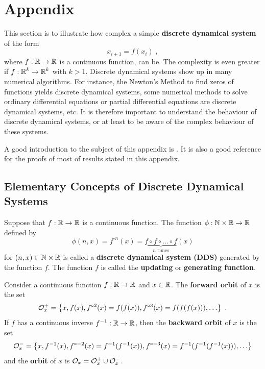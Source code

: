 \section{Appendix}

This section is to illustrate how complex a simple
{\bfseries discrete dynamical system}\label{Discrete Dynamical System}
of the form
\[
x_{i+1} = f(x_i)  \; ,
\]
where $f:\mathbb{R}\rightarrow \mathbb{R}$ is a continuous function, can be.  The
complexity is even greater if
$\displaystyle f:\mathbb{R}^k \rightarrow \mathbb{R}^k$ with $k>1$.
Discrete dynamical systems show up in many numerical algorithms.
For instance, the Newton's Method to find zeros of functions yields
discrete dynamical systems, some numerical methods to solve ordinary
differential equations or partial differential equations are
discrete dynamical systems, etc.  It is therefore important to
understand the behaviour of discrete dynamical systems, or at least to
be aware of the complex behaviour of these systems. 

A good introduction to the subject of this appendix is \cite{D}.  It
is also a good reference for the proofs of most of results stated in this
appendix.

\subsection{Elementary Concepts of Discrete Dynamical Systems}

\begin{defn}
Suppose that $f:\mathbb{R} \rightarrow \mathbb{R}$ is a continuous function.
The function $\phi:\mathbb{N}\times\mathbb{R} \to \mathbb{R}$ defined by
\[
\phi(n,x) = f^{\circ n}(x) = \underbrace{f\circ f\circ ...\circ
f}_{n\text{ times}}(x)
\]
for $(n,x) \in \mathbb{N}\times\mathbb{R}$
is called a {\bfseries discrete dynamical system (DDS)} generated by
the function $f$. The function $f$ is called the
{\bfseries updating} or {\bfseries generating function}.
\end{defn}

\begin{defn}
Consider a continuous function $f:\mathbb{R} \rightarrow \mathbb{R}$ and $x \in \mathbb{R}$.
The {\bfseries forward orbit} of $x$ is the set
\[
\mathcal{O}_x^+ = \left\{ x, f(x), f^{\circ 2}(x) = f(f(x)),
f^{\circ 3}(x)= f(f(f(x))), \ldots
\right\} \  .
\]
If $f$ has a continuous inverse
$\displaystyle f^{-1}:\mathbb{R}\rightarrow \mathbb{R}$, then the
{\bfseries backward orbit} of $x$ is the set
\[
\mathcal{O}_x^- = \left\{ x, f^{-1}(x), f^{\circ -2}(x) = f^{-1}(f^{-1}(x)),
f^{\circ -3}(x)= f^{-1}(f^{-1}(f^{-1}(x))), \ldots \right\}
\]
and the {\bfseries orbit} of $x$ is
$\displaystyle \mathcal{O}_x = \mathcal{O}_x^+ \cup \mathcal{O}_x^-$.
\end{defn}

